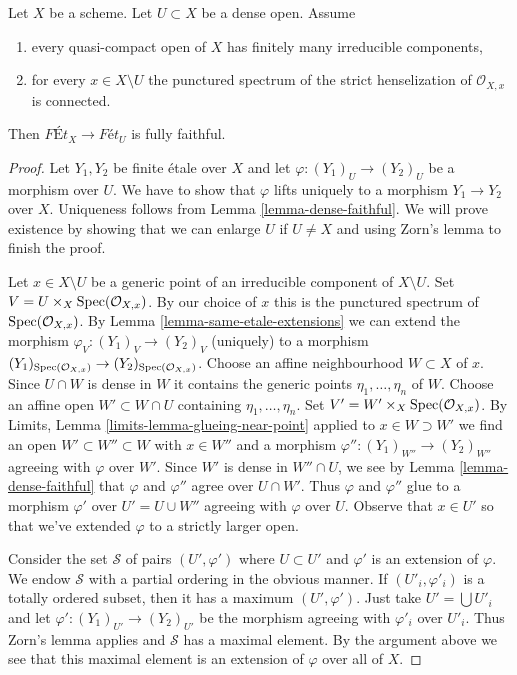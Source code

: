 \begin{lemma}
\label{lemma-quasi-compact-dense-open-connected-at-infinity}
Let $X$ be a scheme. Let $U \subset X$ be a dense open. Assume
\begin{enumerate}
\item every quasi-compact open of $X$ has finitely many
irreducible components,
\item for every $x \in X \setminus U$ the punctured spectrum of the
strict henselization of $\mathcal{O}_{X, x}$ is connected.
\end{enumerate}
Then $\textit{F\'Et}_X \to \textit{F\'et}_U$ is fully faithful.
\end{lemma}

\begin{proof}
Let $Y_1, Y_2$ be finite \'etale over $X$ and let
$\varphi : (Y_1)_U \to (Y_2)_U$ be a morphism over $U$. We have to show that
$\varphi$ lifts uniquely to a morphism $Y_1 \to Y_2$ over $X$.
Uniqueness follows from Lemma \ref{lemma-dense-faithful}.
We will prove existence by showing that we can enlarge $U$
if $U \not = X$ and using Zorn's lemma to finish the proof.

\medskip\noindent
Let $x \in X \setminus U$ be a generic point of an irreducible component
of $X \setminus U$. Set $V = U \times_X \mathop{\mathrm{Spec}}(\mathcal{O}_{X, x})$.
By our choice of $x$ this is the punctured spectrum of
$\mathop{\mathrm{Spec}}(\mathcal{O}_{X, x})$. By
Lemma \ref{lemma-same-etale-extensions}
we can extend the morphism $\varphi_V : (Y_1)_V \to (Y_2)_V$
(uniquely) to a morphism
$(Y_1)_{\mathop{\mathrm{Spec}}(\mathcal{O}_{X, x})} \to (Y_2)_{\mathop{\mathrm{Spec}}(\mathcal{O}_{X, x})}$.
Choose an affine neighbourhood $W \subset X$ of $x$.
Since $U \cap W$ is dense in $W$ it contains the generic points
$\eta_1, \ldots, \eta_n$ of $W$. Choose an affine open
$W' \subset W \cap U$ containing $\eta_1, \ldots, \eta_n$.
Set $V' = W' \times_X \mathop{\mathrm{Spec}}(\mathcal{O}_{X, x})$.
By Limits, Lemma \ref{limits-lemma-glueing-near-point}
applied to $x \in W \supset W'$
we find an open $W' \subset W'' \subset W$ with $x \in W''$
and a morphism $\varphi'' : (Y_1)_{W''} \to (Y_2)_{W''}$
agreeing with $\varphi$ over $W'$. Since $W'$ is dense in
$W'' \cap U$, we see by Lemma \ref{lemma-dense-faithful}
that $\varphi$ and $\varphi''$ agree over $U \cap W'$.
Thus $\varphi$ and $\varphi''$ glue to a morphism
$\varphi'$ over $U' = U \cup W''$ agreeing with $\varphi$ over $U$.
Observe that $x \in U'$ so that we've extended $\varphi$
to a strictly larger open.

\medskip\noindent
Consider the set $\mathcal{S}$ of pairs $(U', \varphi')$ where $U \subset U'$
and $\varphi'$ is an extension of $\varphi$. We endow $\mathcal{S}$
with a partial ordering in the obvious manner. If $(U'_i, \varphi'_i)$
is a totally ordered subset, then it has a maximum $(U', \varphi')$.
Just take $U' = \bigcup U'_i$ and let
$\varphi' : (Y_1)_{U'} \to (Y_2)_{U'}$ be the morphism
agreeing with $\varphi'_i$ over $U'_i$. Thus Zorn's lemma applies
and $\mathcal{S}$ has a maximal element. By the argument above
we see that this maximal element is an extension of $\varphi$
over all of $X$.
\end{proof}

